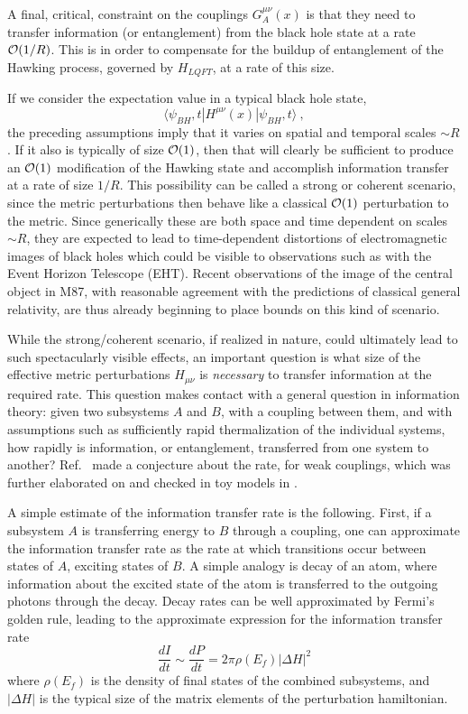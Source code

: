 \documentclass[12pt]{article}
\numberwithin{equation}{section}
\newcommand{\calo}{{\cal O}}
\newcommand{\beq}{\begin{equation}}
\newcommand{\eeq}{\end{equation}}
\begin{document}
A final, critical, constraint on the couplings $G_A^{\mu\nu}(x)$ is that they need to transfer information (or entanglement) from the black hole state at a rate $\calo(1/R)$.  This is in order to compensate for the buildup of entanglement of the Hawking process, governed by $H_{LQFT}$, at a rate of this size. 

If we consider the expectation value in a typical black hole state,
\beq
\langle \psi_{BH},t|H^{\mu\nu}(x)|\psi_{BH},t\rangle\ ,
\eeq
the preceding assumptions imply that it varies on spatial and temporal scales $\sim R$.  If it also is typically of size $\calo(1)$, then that will clearly be sufficient to produce an $\calo(1)$ modification of the Hawking state and accomplish information transfer at a rate of size $1/R$.  This possibility can be called a strong or coherent scenario, since the metric perturbations then behave like a classical $\calo(1)$ perturbation to the metric.  Since generically these are both space and time dependent on scales $\sim R$, they are expected to lead to time-dependent distortions of electromagnetic images of black holes\cite{SGObs,SGAstro,GiPs} which could be visible to observations such as with the Event Horizon Telescope (EHT).  Recent observations of the image of the central object in M87\cite{EHT}, with reasonable agreement with the predictions of classical general relativity, are thus already beginning to place bounds on this kind of scenario.

While the strong/coherent scenario, if realized in nature, could ultimately lead to such spectacularly visible effects, an important question is what size of the effective metric perturbations $H_{\mu\nu}$ is {\it necessary} to transfer information at the required rate.  This question makes contact with a general question in information theory: given two subsystems $A$ and $B$, with a coupling between them, and with assumptions such as sufficiently rapid thermalization of the individual systems, how rapidly is information, or entanglement, transferred from one system to another?  Ref.~\cite{NVU} made a conjecture about the rate, for weak couplings, which was further elaborated on and checked in toy models in \cite{GiRo}.  

A simple estimate of the information transfer rate is the following.  First, if a subsystem $A$ is transferring energy to $B$ through a coupling, one can approximate the information transfer rate as the rate at which transitions occur between states of $A$, exciting states of $B$.  A simple analogy is decay of an atom, where information about the excited state of the atom is transferred to the outgoing photons through the decay.  Decay rates can be well approximated by Fermi's golden rule, leading to the approximate expression for the information transfer rate
\beq\label{inforate}
\frac{dI}{dt}\sim \frac{dP}{dt}=2\pi\rho(E_f) |\Delta H|^2
\eeq
where $\rho(E_f)$ is the density of final states of the combined subsystems, and $|\Delta H|$ is the typical size of the matrix elements of the perturbation hamiltonian.
\end{document}
